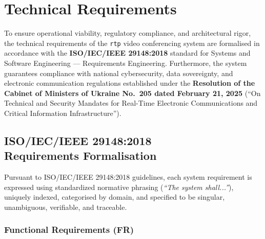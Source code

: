 \documentclass{article}
\begin{document}
\newpage
\section{Technical Requirements}
\label{sec:technical-requirements}

To ensure operational viability, regulatory compliance, and architectural rigor, the technical requirements of the \texttt{rtp} video conferencing system are formalised in accordance with the \textbf{ISO/IEC/IEEE 29148:2018} standard for Systems and Software Engineering --- Requirements Engineering. Furthermore, the system guarantees compliance with national cybersecurity, data sovereignty, and electronic communication regulations established under the \textbf{Resolution of the Cabinet of Ministers of Ukraine No.~205 dated February 21, 2025} (``On Technical and Security Mandates for Real-Time Electronic Communications and Critical Information Infrastructure'').

\subsection{ISO/IEC/IEEE 29148:2018 \\ Requirements Formalisation}

Pursuant to ISO/IEC/IEEE 29148:2018 guidelines, each system requirement is expressed using standardized normative phrasing (\textit{``The system shall...''}), uniquely indexed, categorised by domain, and specified to be singular, unambiguous, verifiable, and traceable.

\subsubsection{Functional Requirements (FR)}
\end{document}

